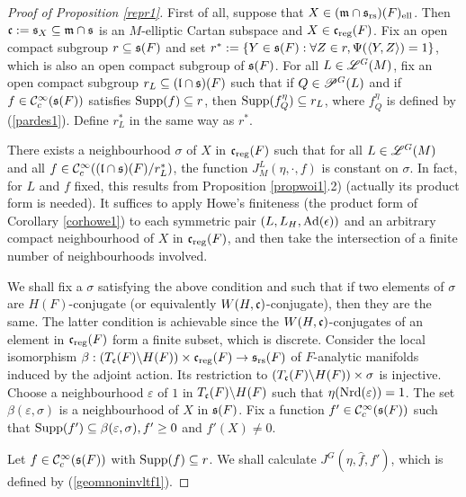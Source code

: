 \documentclass[a4paper]{amsart}
\newcommand{\fm}{{\mathfrak{m}}} \newcommand{\fn}{{\mathfrak{n}}}\newcommand{\fo}{{\mathfrak{o}}} \newcommand{\fp}{{\mathfrak{p}}}
\theoremstyle{definition}
\theoremstyle{remark}
\numberwithin{equation}{subsection}
\begin{document}
\begin{proof}[Proof of Proposition \ref{repr1}]
First of all, suppose that $X\in(\fm\cap\fs_\rs)(F)_\el$. Then $\fc:=\fs_X\subseteq\fm\cap\fs$ is an $M$-elliptic Cartan subspace and $X\in{\mathfrak{c}}_{\mathrm{reg}}(F)$. Fix an open compact subgroup $r\subseteq{\mathfrak{s}}(F)$ and set $r^\ast:=\{Y\in{\mathfrak{s}}(F):\forall Z\in r, \Psi(\langle Y,Z\rangle)=1\}$, which is also an open compact subgroup of ${\mathfrak{s}}(F)$. For all $L\in\mathscr{L}^G(M)$, fix an open compact subgroup $r_L\subseteq({\mathfrak{l}}\cap{\mathfrak{s}})(F)$ such that if $Q\in\mathscr{P}^G(L)$ and if $f\in{\mathcal {C}}_c^\infty({\mathfrak{s}}(F))$ satisfies ${\mathrm{Supp}}(f)\subseteq r$, then ${\mathrm{Supp}}(f_Q^\eta)\subseteq r_L$, where $f_Q^\eta$ is defined by (\ref{pardes1}). Define $r_L^\ast$ in the same way as $r^\ast$. 

There exists a neighbourhood $\sigma$ of $X$ in ${\mathfrak{c}}_{\mathrm{reg}}(F)$ such that for all $L\in\mathscr{L}^G(M)$ and all $f\in{\mathcal {C}}_c^\infty(({\mathfrak{l}}\cap{\mathfrak{s}})(F)/r_L^\ast)$, the function $J_M^L(\eta,\cdot,f)$ is constant on $\sigma$. In fact, for $L$ and $f$ fixed, this results from Proposition \ref{propwoi1}.2) (actually its product form is needed). It suffices to apply Howe's finiteness (the product form of Corollary \ref{corhowe1}) to each symmetric pair $(L,L_H,{\mathrm{Ad}}(\epsilon))$ and an arbitrary compact neighbourhood of $X$ in ${\mathfrak{c}}_{\mathrm{reg}}(F)$, and then take the intersection of a finite number of neighbourhoods involved. 

We shall fix a $\sigma$ satisfying the above condition and such that if two elements of $\sigma$ are $H(F)$-conjugate (or equivalently $W(H,{\mathfrak{c}})$-conjugate), then they are the same. The latter condition is achievable since the $W(H,{\mathfrak{c}})$-conjugates of an element in ${\mathfrak{c}}_{\mathrm{reg}}(F)$ form a finite subset, which is discrete. Consider the local isomorphism $\beta: (T_{\mathfrak{c}}(F)\backslash H(F))\times{\mathfrak{c}}_{\mathrm{reg}}(F)\rightarrow{\mathfrak{s}}_{\mathrm{rs}}(F)$ of $F$-analytic manifolds induced by the adjoint action. Its restriction to $(T_{\mathfrak{c}}(F)\backslash H(F))\times\sigma$ is injective. Choose a neighbourhood $\varepsilon$ of $1$ in $T_{\mathfrak{c}}(F)\backslash H(F)$ such that $\eta({\mathrm{Nrd}}(\varepsilon))=1$. The set $\beta(\varepsilon, \sigma)$ is a neighbourhood of $X$ in ${\mathfrak{s}}(F)$. Fix a function $f'\in{\mathcal {C}}_c^\infty({\mathfrak{s}}(F))$ such that ${\mathrm{Supp}}(f')\subseteq\beta(\varepsilon, \sigma), f'\geq0$ and $f'(X)\neq0$. 

Let $f\in{\mathcal {C}}_c^\infty({\mathfrak{s}}(F))$ with ${\mathrm{Supp}}(f)\subseteq r$. We shall calculate $J^G(\eta,\hat{f},f')$, which is defined by (\ref{geomnoninvltf1}). 


\end{proof}
\end{document}
